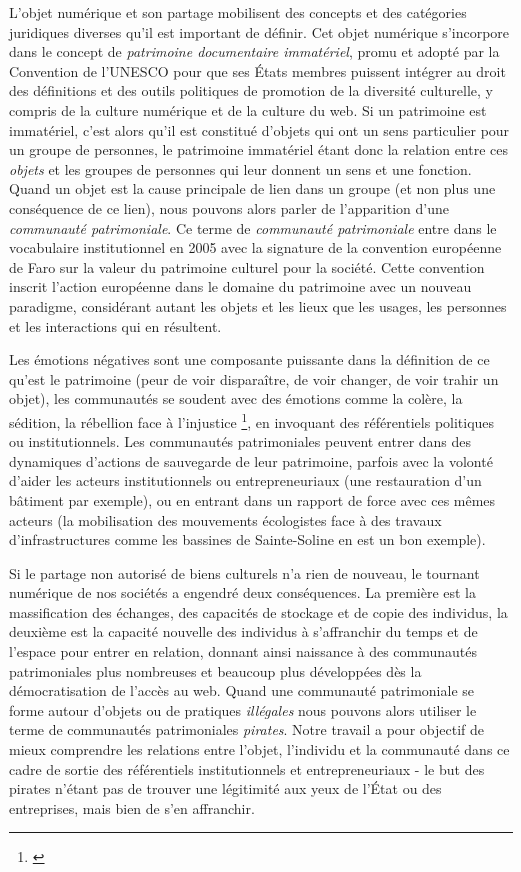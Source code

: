 L'objet numérique et son partage mobilisent des concepts et des catégories juridiques diverses qu'il est important de définir. Cet objet numérique s'incorpore dans le concept de \textit{patrimoine documentaire immatériel}, promu et adopté par la Convention de l'UNESCO pour que ses États membres puissent intégrer au droit des définitions et des outils politiques de promotion de la diversité culturelle, y compris de la culture numérique et de la culture du web. Si un patrimoine est immatériel, c'est alors qu'il est constitué d'objets qui ont un sens particulier pour un groupe de personnes, le patrimoine immatériel étant donc la relation entre ces \textit{objets} et les groupes de personnes qui leur donnent un sens et une fonction. Quand un objet est la cause principale de lien dans un groupe (et non plus une conséquence de ce lien), nous pouvons alors parler de l'apparition d'une \textit{communauté patrimoniale}. Ce terme de \textit{communauté patrimoniale} entre dans le vocabulaire institutionnel en 2005 avec la signature de la convention européenne de Faro sur la valeur du patrimoine culturel pour la société. Cette convention inscrit l'action européenne dans le domaine du patrimoine avec un nouveau paradigme, considérant autant les objets et les lieux que les usages, les personnes et les interactions qui en résultent.

Les émotions négatives sont une composante puissante dans la définition de ce qu'est le patrimoine (peur de voir disparaître, de voir changer, de voir trahir un objet), les communautés se soudent avec des émotions comme la colère, la sédition, la rébellion face à l'injustice \footnote{\cite{fabre_emotions_2013}}, en invoquant des référentiels politiques ou institutionnels.  Les communautés patrimoniales peuvent entrer dans des dynamiques d'actions de sauvegarde de leur patrimoine, parfois avec la volonté d'aider les acteurs institutionnels ou entrepreneuriaux (une restauration d'un bâtiment par exemple), ou en entrant dans un rapport de force avec ces mêmes acteurs (la mobilisation des mouvements écologistes face à des travaux d'infrastructures comme les bassines de Sainte-Soline en est un bon exemple). 

Si le partage non autorisé de biens culturels n'a rien de nouveau, le tournant numérique de nos sociétés a engendré deux conséquences. La première est la massification des échanges, des capacités de stockage et de copie des individus,  la deuxième est la capacité nouvelle des individus à s'affranchir du temps et de l'espace pour entrer en relation, donnant ainsi naissance à des communautés patrimoniales plus nombreuses et beaucoup plus développées dès la démocratisation de l'accès au web. Quand une communauté patrimoniale se forme autour d'objets ou de pratiques \textit{illégales} nous pouvons alors utiliser le terme de communautés patrimoniales \textit{pirates}. Notre travail a pour objectif de mieux comprendre les relations entre l'objet, l'individu et la communauté dans ce cadre de sortie des référentiels institutionnels et entrepreneuriaux - le but des pirates n'étant pas de trouver une légitimité aux yeux de l'État ou des entreprises, mais bien de s'en affranchir.

